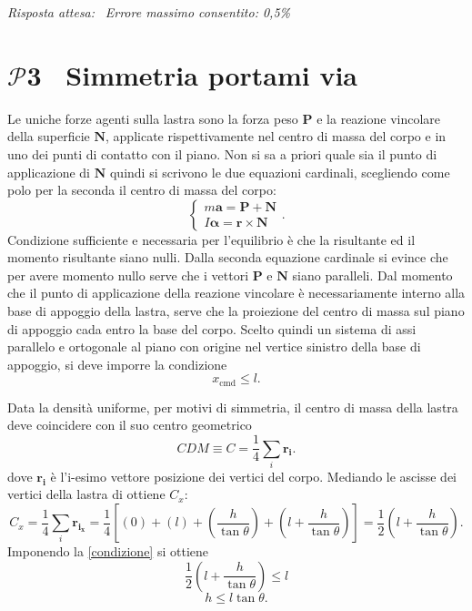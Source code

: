 \documentclass[a4paper,12pt]{article}
\newcommand{\problemtitle}[1]{
  \noindent
  \textbf{\Large #1}\hspace{0.5em}
  \raisebox{0.6ex}{\rule{\linewidth - \widthof{\textbf{\Large #1}} - 0.6em}{0.4pt}}%
}
\begin{document}
\textit{Risposta attesa:}  \, \textit{Errore massimo consentito: 0,5\%}



\section*{\problemtitle{$\mathcal{P}${\small{3}} \ Simmetria portami via}}

Le uniche forze agenti sulla lastra sono la forza peso $\mathbf{P}$ e la reazione vincolare della superficie $\mathbf{N}$, applicate rispettivamente nel centro di massa del corpo e in uno dei punti di contatto con il piano. Non si sa a priori quale sia il punto di applicazione di $\mathbf{N}$ quindi si scrivono le due equazioni cardinali, scegliendo come polo per la seconda il centro di massa del corpo:
\[
\begin{cases}
m\mathbf{a} = \mathbf{P} + \mathbf{N} \\
I {\boldsymbol{\alpha}} = \mathbf{r} \times \mathbf{N}
\end{cases}
.
\tag{3.0}
\]
Condizione sufficiente e necessaria per l'equilibrio è che la risultante ed il momento risultante siano nulli. 
Dalla seconda equazione cardinale si evince che per avere momento nullo serve che i vettori $\mathbf{P}$ e $\mathbf{N}$ siano paralleli. Dal momento che il punto di applicazione della reazione vincolare è necessariamente interno alla base di appoggio della lastra, serve che la proiezione del centro di massa sul piano di appoggio cada entro la base del corpo. Scelto quindi un sistema di assi parallelo e ortogonale al piano con origine nel vertice sinistro della base di appoggio, si deve imporre la condizione
\[
x_{\text{cmd}} \leq l. \tag{3.1} \label{condizione}
\]

Data la densità uniforme, per motivi di simmetria, il centro di massa della lastra deve coincidere con il suo centro geometrico
\[
CDM \equiv C = \frac{1}{4} \sum_{i} \mathbf{r_i}. \tag{3.2}
\]
dove $\mathbf{r_i}$ è l'i-esimo vettore posizione dei vertici del corpo. Mediando le ascisse dei vertici della lastra di ottiene $C_x$:
\[
C_x = \frac{1}{4} \sum_{i} \mathbf{r_{i_x}} = \frac{1}{4}\left[(0)+(l)+\left(\frac{h}{\tan\theta}\right)+\left(l+\frac{h}{\tan\theta}\right)\right] = \frac{1}{2}\left(l+\frac{h}{\tan\theta}\right). \tag{3.3}
\] 
Imponendo la \ref{condizione} si ottiene
\[
\frac{1}{2}\left(l+\frac{h}{\tan\theta}\right) \leq l \tag{3.4}
\]
\[
h \leq l\tan\theta. \tag{3.5}
\]
\end{document}
